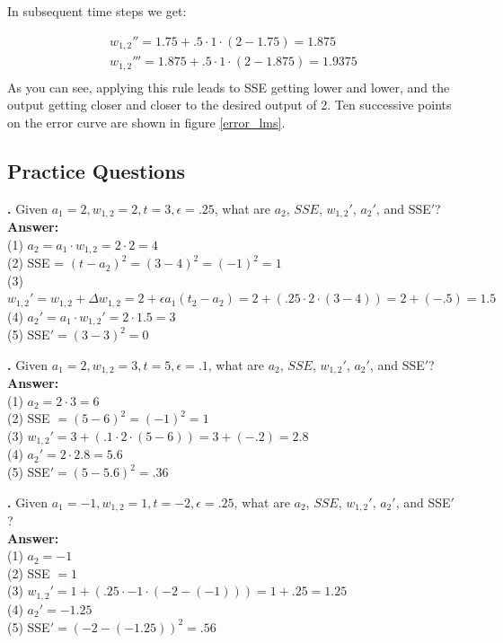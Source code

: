 In subsequent time steps we get:

\begin{eqnarray*}
w_{1,2}'' = 1.75 + .5 \cdot 1 \cdot (2 - 1.75) = 1.875 \\
w_{1,2}''' = 1.875 + .5 \cdot 1 \cdot (2 - 1.875) = 1. 9375 \\
\end{eqnarray*}
As you can see, applying this rule leads to SSE getting lower and lower, and the output getting closer and closer to the desired output of 2. Ten successive points on the error curve are shown in figure \ref{error_lms}.

\subsection{Practice Questions}



\noindent
{}
{\bf \theLMSCounter.}  Given $a_1 = 2 ,w_{1,2} = 2 ,t = 3 ,\epsilon = .25$, what are $a_2$, $SSE$, $w_{1,2}'$, $a_2'$, and SSE$'$? \\
{\bf Answer:}  \\
(1) $a_2 = a_1 \cdot w_{1,2} = 2 \cdot 2 = 4$ \\
(2) SSE = $(t-a_2)^2 = (3-4)^2 = (-1)^2 = 1$ \\
(3) $w_{1,2}' = w_{1,2} + \Delta w_{1,2}  = 2 +  \epsilon a_1 (t_2 - a_2) = 2 + (.25 \cdot 2 \cdot (3 - 4)) = 2+(-.5) = 1.5$\\
(4) $a_2' =  a_1 \cdot w_{1,2}' = 2 \cdot 1.5 = 3$ \\
(5) SSE$' = (3-3)^2 = 0$
\bigskip

\noindent
{}
{\bf \theLMSCounter.}  Given $a_1 = 2 ,w_{1,2} = 3, t = 5 ,\epsilon = .1$, what are $a_2$, $SSE$, $w_{1,2}'$, $a_2'$, and SSE$'$? \\
{\bf Answer:} \\
(1) $a_2 = 2 \cdot 3 = 6$ \\
(2) SSE $= (5-6)^2 = (-1)^2 = 1$ \\
(3) $w_{1,2}' = 3 + (.1 \cdot 2 \cdot (5-6)) = 3 + (-.2) = 2.8$ \\
(4) $a_2' = 2 \cdot 2.8= 5.6$ \\
(5) SSE$' = (5-5.6)^2 = .36$
\bigskip

\noindent
{}
{\bf \theLMSCounter.}  Given $a_1 = -1 ,w_{1,2} = 1, t = -2 ,\epsilon = .25$, what are $a_2$, $SSE$, $w_{1,2}'$, $a_2'$, and SSE$'$? \\
{\bf Answer:} \\
(1) $a_2 = -1$ \\
(2) SSE $= 1$ \\
(3) $w_{1,2}' = 1 + (.25 \cdot -1 \cdot (-2-(-1))) = 1 + .25 = 1.25$ \\
(4) $a_2' = -1.25$ \\
(5) SSE$' = (-2 - (-1.25))^2 = .56$
\bigskip

